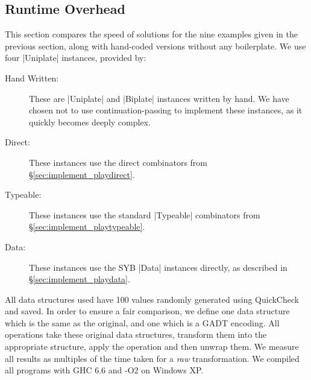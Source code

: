 \documentclass[preprint]{sigplanconf}
\begin{document}
\subsection{Runtime Overhead}
\label{sec:results_speed}

This section compares the speed of solutions for the nine examples given in the previous section, along with hand-coded versions without any boilerplate. We use four |Uniplate| instances, provided by:

\begin{description}
\item[Hand Written:] These are |Uniplate| and |Biplate| instances written by hand. We have chosen not to use continuation-passing to implement these instances, as it quickly becomes deeply complex.
\item[Direct:] These instances use the direct combinators from \S\ref{sec:implement_playdirect}.
\item[Typeable:] These instances use the standard |Typeable| combinators from \S\ref{sec:implement_playtypeable}.
\item[Data:] These instances use the SYB |Data| instances directly, as described in \S\ref{sec:implement_playdata}.
\end{description}

All data structures used have 100 values randomly generated using QuickCheck \citep{quickcheck} and saved. In order to ensure a fair comparison, we define one data structure which is the same as the original, and one which is a GADT encoding. All operations take these original data structures, transform them into the appropriate structure, apply the operation and then unwrap them. We measure all results as multiples of the time taken for a \textit{raw} transformation. We compiled all programs with GHC 6.6 and -O2 on Windows XP.
\end{document}

